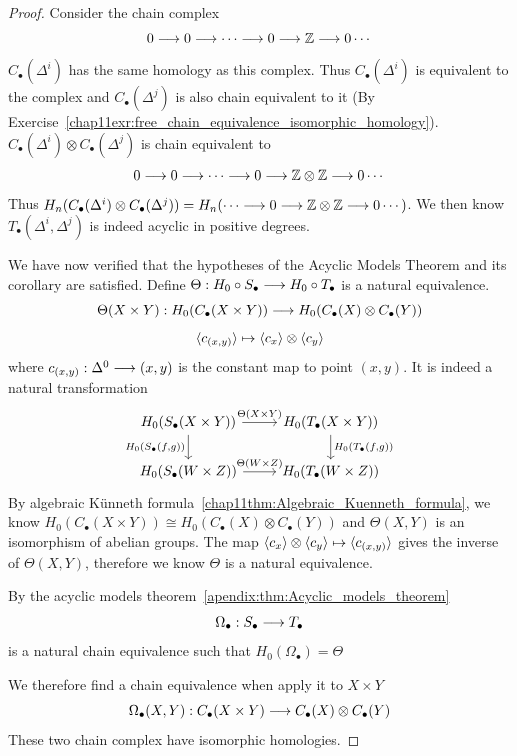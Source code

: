 \documentclass[11pt]{book} %
\begin{document}
\begin{proof}
Consider the chain complex
$$
0\longrightarrow 0\longrightarrow \cdots\longrightarrow 0\longrightarrow \mathbb Z\longrightarrow 0\cdots
$$
$C_\bullet(\Delta^i)$ has the same homology as this complex. Thus $C_\bullet(\Delta^i)$ is equivalent to the complex and $C_\bullet(\Delta^j)$ is also chain equivalent to it (By Exercise~\ref{chap11exr:free_chain_equivalence_isomorphic_homology}). $C_\bullet(\Delta^i)\otimes C_\bullet(\Delta^j)$ is chain equivalent to 
$$
0\longrightarrow 0\longrightarrow \cdots\longrightarrow 0\longrightarrow \mathbb Z\otimes \mathbb Z\longrightarrow 0\cdots
$$
Thus $H_n(C_\bullet(\Delta^i)\otimes C_\bullet(\Delta^j))=H_n(\cdots\longrightarrow0\longrightarrow \mathbb Z\otimes \mathbb Z\longrightarrow 0\cdots)$. We then know $T_\bullet(\Delta^i,\Delta^j)$ is indeed acyclic in positive degrees. 

We have now verified that the hypotheses of the Acyclic Models Theorem and
its corollary are satisfied.
Define  
$\Theta:H_0\circ S_\bullet\longrightarrow H_0\circ T_\bullet$ is a natural equivalence.
$$
\Theta(X\times Y):H_0(C_\bullet(X\times Y))\longrightarrow H_0(C_\bullet(X)\otimes C_\bullet (Y))
$$
$$
\langle c_{(x,y)}\rangle\mapsto \langle c_x\rangle\otimes\langle c_y\rangle
$$
where $c_{(x,y)}:\Delta^0\longrightarrow (x,y)$ is the constant map to point $(x,y)$. It is indeed a natural transformation
\[
\begin{tikzcd}
H_0(S_\bullet(X\times Y)) \arrow[d, "{H_0(S_\bullet(f,g))}"'] \arrow[r, "\Theta(X\times Y)"] & H_0(T_\bullet(X\times Y)) \arrow[d, "{H_0(T_\bullet(f, g))}"] \\
H_0(S_\bullet(W\times Z)) \arrow[r, "\Theta(W\times Z)"] & H_0(T_\bullet(W\times Z))
\end{tikzcd}
\]
By algebraic K\"unneth formula~\ref{chap11thm:Algebraic_Kuenneth_formula}, we know $H_0(C_\bullet(X\times Y))\cong H_0(C_\bullet(X)\otimes C_\bullet (Y))$ and $\Theta(X,Y)$ is an isomorphism of abelian groups.
The map $ \langle c_x\rangle\otimes\langle c_y\rangle\mapsto \langle c_{(x,y)}\rangle$ gives the inverse of $\Theta(X,Y)$, therefore we know $\Theta$ is a natural equivalence.

By the acyclic models theorem~\ref{apendix:thm:Acyclic_models_theorem}
$$
\Omega_\bullet: S_\bullet\longrightarrow T_\bullet
$$
 is a natural chain equivalence such that $H_0(\Omega_\bullet)=\Theta$

 We therefore find a chain equivalence when apply it to $X\times Y$
 $$
\Omega_\bullet(X,Y):C_\bullet(X\times Y)\longrightarrow C_\bullet(X)\otimes C_\bullet(Y)
 $$
 These two chain complex have isomorphic homologies.
\end{proof}
\end{document}
